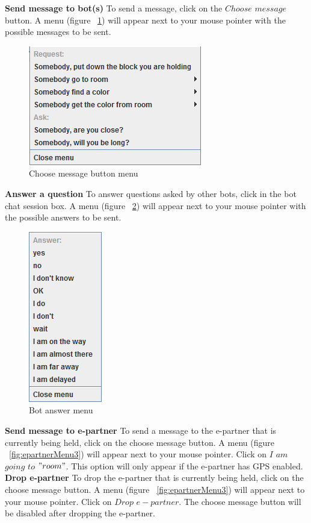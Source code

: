 \textbf{Send message to bot(s)}
To send a message, click on the $Choose$ $message$ button. A menu (figure ~\ref{fig:messageBot}) will appear next to your mouse pointer with the possible messages to be sent.
\\
\begin{figure}[h]
\begin{center}
\includegraphics{NewFeatures/hpg-bot-message.png}
\end{center}
\caption{Choose message button menu}
\label{fig:messageBot}
\end{figure}

\textbf{Answer a question}
To answer questions asked by other bots, click in the bot chat session box. A menu (figure ~\ref{fig:answerBot}) will appear next to your mouse pointer with the possible answers to be sent.
\\
\begin{figure}[h]
\begin{center}
\includegraphics{NewFeatures/hpg-bot-chat.png}
\end{center}
\caption{Bot answer menu}
\label{fig:answerBot}
\end{figure}

\textbf{Send message to e-partner}
To send a message to the e-partner that is currently being held, click on the choose message button. A menu (figure  ~\ref{fig:epartnerMenu3}) will appear next to your mouse pointer. Click on $I$ $am$ $going$ $to$ $"room"$. This option will only appear if the e-partner has GPS enabled.
\\
\textbf{Drop e-partner}
To drop the e-partner that is currently being held, click on the choose message button. A menu (figure  ~\ref{fig:epartnerMenu3}) will appear next to your mouse pointer. Click on $Drop$ $e-partner$. The choose message button will be disabled after dropping the e-partner.